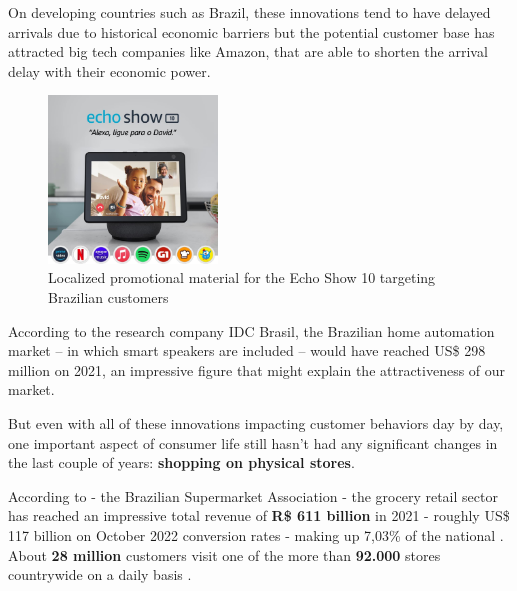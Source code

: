 \documentclass[openright]{normas-utf-tex} %
\begin{document}
On developing countries such as Brazil, these innovations tend to
have delayed arrivals due to historical economic barriers but the potential
customer base has attracted big tech companies like Amazon, that are able
to shorten the arrival delay with their economic power.

\begin{figure}[h!]
	\centering
	\includegraphics[width=0.4\textwidth]{./images/alexabr.jpg} %
	\caption[Localized promotional material for the Echo Show 10 targeting Brazilian customers]{Localized promotional material for the Echo Show 10 targeting Brazilian customers}
    \label{fig:alexabr}
\end{figure}

According to the research company IDC Brasil, the Brazilian home automation
market -- in which smart speakers are included -- would have reached US\$ 298
million on 2021, an impressive figure that might explain the attractiveness of
our market.

%


But even with all of these innovations impacting customer behaviors day by day, one
important aspect of consumer life still hasn't had any significant changes in
the last couple of years: \textbf{shopping on
physical stores}.

According to  - the
Brazilian Supermarket Association - the grocery retail sector has reached an
impressive total revenue of \textbf{R\$ 611 billion} in 2021 - roughly US\$ 117 billion on
October 2022 conversion rates - making up 7,03\% of the national . About \textbf{28 million} customers visit one of the more than
\textbf{92.000} stores countrywide on a daily basis \cite{Abras2022}.
\end{document}
